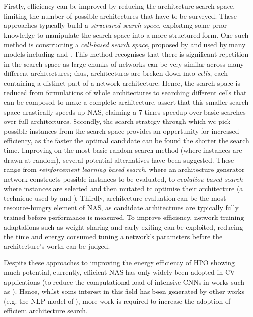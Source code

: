 \documentclass[a4paper, 12pt]{article}
\begin{document}
    Firstly, efficiency can be improved by reducing the architecture search space, limiting the number of possible architectures that have to be surveyed. These approaches typically build a \emph{structured search space}, exploiting some prior knowledge to manipulate the search space into a more structured form. One such method is constructing a \emph{cell-based search space}, proposed by  and used by many models including  and . This method recognises that there is significant repetition in the search space as large chunks of networks can be very similar across many different architectures; thus, architectures are broken down into \emph{cells}, each containing a distinct part of a network architecture. Hence, the search space is reduced from formulations of whole architectures to searching different cells that can be composed to make a complete architecture.  assert that this smaller search space drastically speeds up NAS, claiming a 7 times speedup over basic searches over full architectures. Secondly, the search strategy through which we pick possible instances from the search space provides an opportunity for increased efficiency, as the faster the optimal candidate can be found the shorter the search time. Improving on the most basic random search method (where instances are drawn at random), several potential alternatives have been suggested. These range from \emph{reinforcement learning based search}, where an architecture generator network constructs possible instances to be evaluated, to \emph{evolution based search} where instances are selected and then mutated to optimise their architecture (a technique used by  and ). Thirdly, architecture evaluation can be the most resource-hungry element of NAS, as candidate architectures are typically fully trained before performance is measured. To improve efficiency, network training adaptations such as weight sharing and early-exiting can be exploited, reducing the time and energy consumed tuning a network's parameters before the architecture's worth can be judged. 
    
    Despite these approaches to improving the energy efficiency of HPO showing much potential, currently, efficient NAS has only widely been adopted in CV applications (to reduce the computational load of intensive CNNs in works such as ). Hence, whilst some interest in this field has been generated by other works (e.g. the NLP model of ), more work is required to increase the adoption of efficient architecture search.
\end{document}
